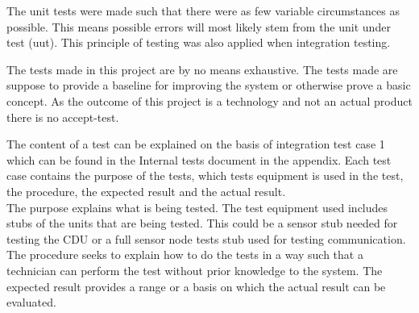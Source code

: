 The unit tests were made such that there were as few variable circumstances as possible. This means possible errors will most likely stem from the unit under test (uut). This principle of testing was also applied when integration testing.

The tests made in this project are by no means exhaustive. The tests made are suppose to provide a baseline for improving the system or otherwise prove a basic concept. As the outcome of this project is a technology and not an actual product there is no accept-test.

The content of a test can be explained on the basis of integration test case 1 which can be found in the Internal tests document in the appendix. Each test case contains the purpose of the tests, which tests equipment is used in the test, the procedure, the expected result and the actual result.\\ 
The purpose explains what is being tested. The test equipment used includes stubs of the units that are being tested. This could be a sensor stub needed for testing the CDU or a full sensor node tests stub used for testing communication. The procedure seeks to explain how to do the tests in a way such that a technician can perform the test without prior knowledge to the system. The expected result provides a range or a basis on which the actual result can be evaluated.\\

